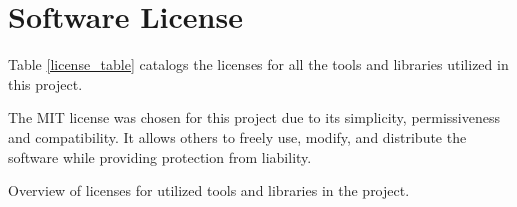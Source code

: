 \section{Software License}
\label{sec:2.6}

Table \ref{license_table} catalogs the licenses for all the tools and libraries utilized in this project.

The MIT license was chosen for this project due to its simplicity, permissiveness and compatibility. It allows others to freely use, modify, and distribute the software while providing protection from liability.

{Overview of licenses for utilized tools and libraries in the project.}
